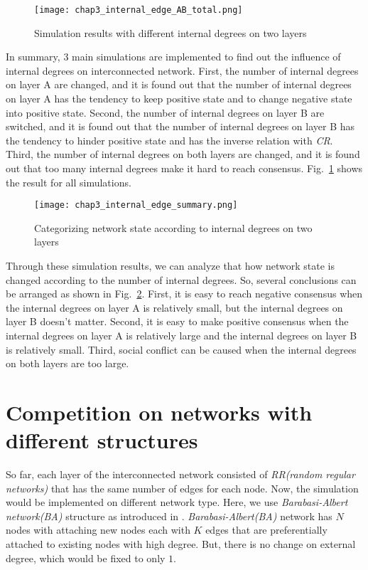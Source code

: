 \begin{figure}[!htb]
	\centering
	\texttt{[image: chap3\_internal\_edge\_AB\_total.png]}
	\caption{Simulation results with different internal degrees on two layers}
	\label{chap3_internal_edge_AB_total}
\end{figure}

In summary, 3 main simulations are implemented to find out the influence of internal degrees on interconnected network. First, the number of internal degrees on layer A are changed, and it is found out that the number of internal degrees on layer A has the tendency to keep positive state and to change negative state into positive state. Second, the number of internal degrees on layer B are switched, and it is found out that the number of internal degrees on layer B has the tendency to hinder positive state and has the inverse relation with \textit{CR}. Third, the number of internal degrees on both layers are changed, and it is found out that too many internal degrees make it hard to reach consensus. Fig.~\ref{chap3_internal_edge_AB_total} shows the result for all simulations. 


\begin{figure}[!htb]
	\centering
	\texttt{[image: chap3\_internal\_edge\_summary.png]}
	\caption{Categorizing network state according to internal degrees on two layers}
	\label{chap3_internal_edge_summary}
	\end{figure}

Through these simulation results, we can analyze that how network state is changed according to the number of internal degrees. So, several conclusions can be arranged  as shown in Fig.~\ref{chap3_internal_edge_summary}.  First, it is easy to reach negative consensus when the internal degrees on layer A is relatively small, but the internal degrees on layer B doesn't matter. Second, it is easy to make positive consensus when the internal degrees on layer A is relatively large and the internal degrees on layer B is relatively small. Third, social conflict can be caused when the internal degrees on both layers are too large.  

\section{Competition on networks with different structures}
So far, each layer of the interconnected network consisted of \textit{RR(random regular networks)} that has the same number of edges for each node. Now, the simulation would be implemented on different network type. Here, we use \textit{Barabasi-Albert network(BA)} structure as introduced in \cite{barabasi1999}. \textit{Barabasi-Albert(BA)} network has $N$ nodes with attaching new nodes each with $K$ edges that are preferentially attached to existing nodes with high degree. But, there is no change on external degree, which would be fixed to only $1$.

